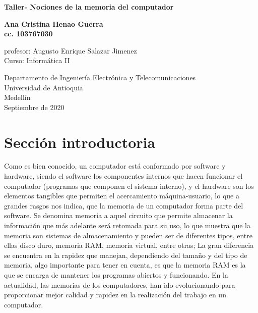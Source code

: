\documentclass{article}
\begin{document}
\begin{titlepage}
    \begin{center}
        \vspace*{1cm}
            
        \Huge
        \textbf{Taller- Nociones de la memoria del computador}
            
        \vspace{0.5cm}
        \LARGE
        
            
        \vspace{1.5cm}
            
        \textbf{Ana Cristina Henao Guerra}\\
        \textbf{cc. 103767030}
            
        
        \vspace*{3cm}
        \large{profesor: Augusto Enrique Salazar Jimenez}\\
        Curso: Informática II
        \vfill
            
        \vspace{0.8cm}
            
        \Large
        Departamento de Ingeniería Electrónica y Telecomunicaciones\\
        Universidad de Antioquia\\
        Medellín\\
        Septiembre de 2020
            
    \end{center}
\end{titlepage}

\tableofcontents
\newpage
\section{Sección introductoria}\label{intro}
Como es bien conocido, un computador está conformado por software y hardware, siendo el software los componentes internos que hacen funcionar el computador (programas que componen el sistema interno), y el hardware son los elementos tangibles que permiten el acercamiento máquina-usuario, lo que a grandes rasgos nos indica, que la memoria de un computador forma parte del software. Se denomina memoria a aquel circuito que permite almacenar la información que más adelante será retomada para su uso, lo que muestra que la memoria son sistemas de almacenamiento y pueden ser de diferentes tipos, entre ellas disco duro, memoria RAM, memoria virtual, entre otras; La  gran diferencia se encuentra en la rapidez que manejan, dependiendo del tamaño y del tipo de memoria, algo importante para tener en cuenta, es que la memoria RAM es la que se encarga de mantener los programas abiertos y funcionando.
En la actualidad, las memorias de los computadores, han ido evolucionando para proporcionar mejor calidad y rapidez en la realización del trabajo en un computador.\\
\end{document}
